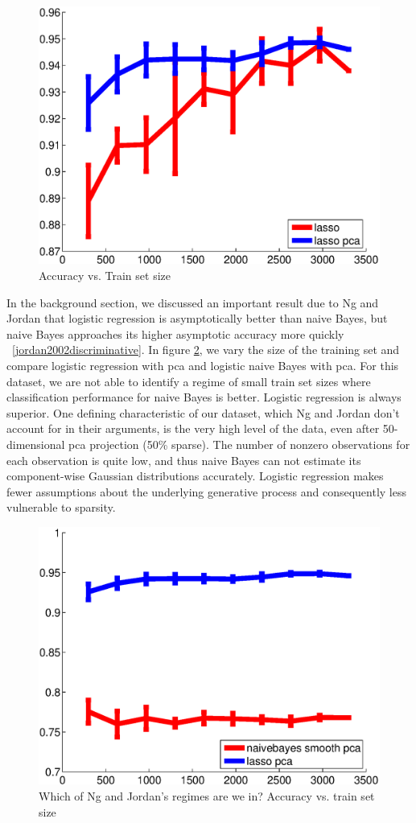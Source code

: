 \begin{center}
\begin{figure}[!ht]
\centering
\includegraphics[width=.7\textwidth]{../images/_lasso_lasso_pca_acc.eps}
\caption{Accuracy vs. Train set size}
\label{fig:lassoCompare}
\end{figure}
\end{center}

	In the background section, we discussed an important result due to Ng and Jordan that logistic regression is asymptotically better than naive Bayes, but naive Bayes approaches its higher asymptotic accuracy more quickly ~\ref{jordan2002discriminative}. In figure \ref{fig:Ngcompare}, we vary the size of the training set and compare logistic regression with pca and logistic naive Bayes with pca. For this dataset, we are not able to identify a regime of small train set sizes where classification performance for naive Bayes is better. Logistic regression is always superior. One defining characteristic of our dataset, which Ng and Jordan don't account for in their arguments, is the very high level of the data, even after 50-dimensional pca projection (50\% sparse). The number of nonzero observations for each observation is quite low, and thus naive Bayes can not estimate its component-wise Gaussian distributions accurately. Logistic regression makes fewer assumptions about the underlying generative process and consequently less vulnerable to sparsity. 
 
\begin{center}
\begin{figure}[!ht]
\centering
\includegraphics[width=.7\textwidth]{../images/_naivebayes_smooth_pca_lasso_pca_acc.eps}
\caption{Which of Ng and Jordan's regimes are we in? Accuracy vs. train set size}
\label{fig:Ngcompare}
\end{figure}
\end{center}



